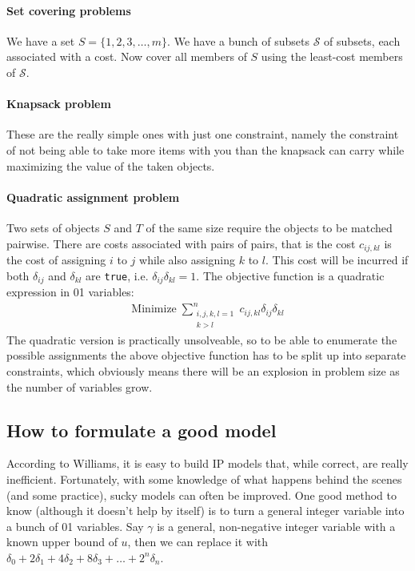 \documentclass[13pt, letterpaper, twoside]{book}
\begin{document}
\paragraph*{Set covering problems} We have a set $S = \{1,2,3,\dots,m\}$. We have a bunch of subsets $\mathcal{S}$ of subsets, each associated with a cost. Now cover all members of $S$ using the least-cost members of $\mathcal{S}$.

\paragraph*{Knapsack problem} These are the really simple ones with just one constraint, namely the constraint of not being able to take more items with you than the knapsack can carry while maximizing the value of the taken objects.

\paragraph*{Quadratic assignment problem} Two sets of objects $S$ and $T$ of the same size require the objects to be matched pairwise. There are costs associated with pairs of pairs, that is the cost $c_{ij,kl}$ is the cost of assigning $i$ to $j$ while also assigning $k$ to $l$. This cost will be incurred if both $\delta_{ij}$ and $\delta_{kl}$ are \texttt{true}, i.e. $\delta_{ij}\delta_{kl} = 1$. The objective function is a quadratic expression in 01 variables:
\begin{align}
\mathrm{Minimize}\;\sum^n_{\substack{i,j,k,l=1\\k>l}} c_{ij,kl}\delta_{ij}\delta_{kl}
\end{align}
The quadratic version is practically unsolveable, so to be able to enumerate the possible assignments the above objective function has to be split up into separate constraints, which obviously means there will be an explosion in problem size as the number of variables grow.

\subsection{How to formulate a good model}
According to Williams, it is easy to build IP models that, while correct, are really inefficient. Fortunately, with some knowledge of what happens behind the scenes (and some practice), sucky models can often be improved. One good method to know (although it doesn't help by itself) is to turn a general integer variable into a bunch of 01 variables. Say $\gamma$ is a general, non-negative integer variable with a known upper bound of $u$, then we can replace it with $\delta_0 + 2\delta_1 + 4\delta_2 + 8\delta_3 + \dots + 2^n\delta_n$. 
\end{document}
